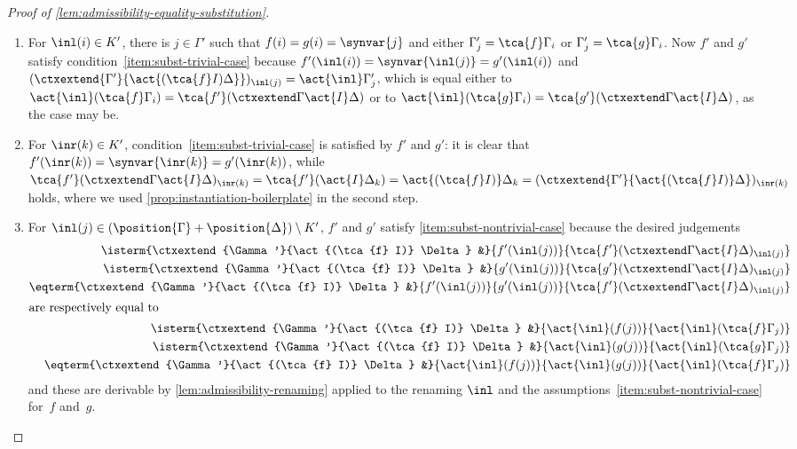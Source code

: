 \begin{proof}[Proof of \cref{lem:admissibility-equality-substitution}]
\begin{enumerate}
  \item
    For $\inl(i) \in K'$, there is $j \in \Gamma'$ such that $f(i) = g(i) = \synvar{j}$ and either $\Gamma'_j = \tca{f} \Gamma_i$ or $\Gamma'_j = \tca{g} \Gamma_i$.
    Now $f'$ and $g'$ satisfy condition~\eqref{item:subst-trivial-case} because $f'(\inl(i)) = \synvar{\inl(j)} = g'(\inl(i))$ and
    $(\ctxextend{\Gamma'}{\act{(\tca{f} I) \Delta}})_{\inl(j)} = \act{{\inl}} \Gamma'_j$, which is equal either to $\act{{\inl}} (\tca{f} \Gamma_i) = \tca{f'} (\ctxextend \Gamma {\act{I} \Delta})$ or to $\act{{\inl}} (\tca{g} \Gamma_i) = \tca{g'} (\ctxextend \Gamma {\act{I} \Delta})$, as the case may be.

  \item
    For $\inr(k) \in K'$, condition~\eqref{item:subst-trivial-case} is satisfied by $f'$ and $g'$: it is clear that
    $
    f'(\inr(k)) = \synvar{\inr(k)} = g'(\inr(k))
    $,
    while
    $
    \tca{f'} (\ctxextend \Gamma {\act{I} \Delta})_{\inr(k)}
    = \tca{f'} (\act{I} \Delta_k)
    = \act{(\tca{f} I)} \Delta_k
    = (\ctxextend {\Gamma'}{\act{(\tca{f} I)} \Delta})_{\inr(k)}
    $
    holds, where we used \cref{prop:instantiation-boilerplate} in the second step.

  \item
    For $\inl(j) \in (\position{\Gamma} + \position{\Delta}) \setminus K'$, $f'$ and $g'$ satisfy \eqref{item:subst-nontrivial-case} because the desired judgements
    \begin{align*}
      \isterm
        {\ctxextend {\Gamma'}{\act{(\tca{f} I)} \Delta} &}
        {f'(\inl(j))}
        {\tca{f'} (\ctxextend \Gamma {\act{I} \Delta})_{\inl(j)}}
      \\
      \isterm
        {\ctxextend {\Gamma'}{\act{(\tca{f} I)} \Delta} &}
        {g'(\inl(j))}
        {\tca{g'} (\ctxextend \Gamma {\act{I} \Delta})_{\inl(j)}}
      \\
      \eqterm
        {\ctxextend {\Gamma'}{\act{(\tca{f} I)} \Delta} &}
        {f'(\inl(j))}
        {g'(\inl(j))}
        {\tca{f'} (\ctxextend \Gamma {\act{I} \Delta})_{\inl(j)}}
      \\
      \intertext{are respectively equal to}
      \isterm
        {\ctxextend {\Gamma'}{\act{(\tca{f} I)} \Delta} &}
        {\act{{\inl}} (f(j))}
        {\act{{\inl}} (\tca{f} \Gamma_j)}
      \\
      \isterm
        {\ctxextend {\Gamma'}{\act{(\tca{f} I)} \Delta} &}
        {\act{{\inl}} (g(j))}
        {\act{{\inl}} (\tca{g} \Gamma_j)}
      \\
      \eqterm
        {\ctxextend {\Gamma'}{\act{(\tca{f} I)} \Delta} &}
        {\act{{\inl}} (f(j))}
        {\act{{\inl}} (g(j))}
        {\act{{\inl}} (\tca{f} \Gamma_j)}
    \end{align*}
    and these are derivable by \cref{lem:admissibility-renaming} applied to the renaming $\inl$ and the assumptions~\eqref{item:subst-nontrivial-case} for~$f$ and~$g$.
  \end{enumerate}


\end{proof}
